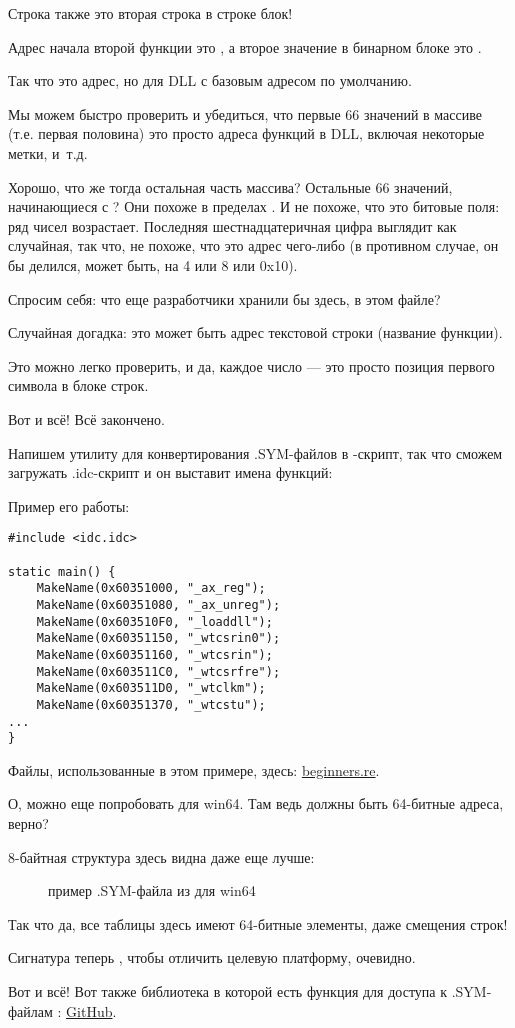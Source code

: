 Строка  также это вторая строка в строке блок!

Адрес начала второй функции это , а второе значение в бинарном блоке это .

Так что это адрес, но для DLL с базовым адресом по умолчанию.

Мы можем быстро проверить и убедиться, что первые 66 значений в массиве (т.е. первая половина)
это просто адреса функций в DLL, включая некоторые метки, и~т.д.

Хорошо, что же тогда остальная часть массива? 
Остальные 66 значений, начинающиеся с ? 
Они похоже в пределах \TT{[0...0x3F8]}. 
И не похоже, что это битовые поля: ряд чисел возрастает.
Последняя шестнадцатеричная цифра выглядит как случайная, так что, не похоже, что это
адрес чего-либо (в противном случае, он бы делился, может быть, на 4 или 8 или 0x10).

Спросим себя: что еще разработчики \oracle хранили бы здесь, в этом файле?

Случайная догадка: это может быть адрес текстовой строки (название функции).

Это можно легко проверить, и да, каждое число --- это просто позиция первого символа в блоке строк.

Вот и всё! Всё закончено.

Напишем утилиту для конвертирования .SYM-файлов в \IDA-скрипт, 
так что сможем загружать .idc-скрипт и он выставит имена функций:



Пример его работы:

\begin{lstlisting}[style=customc]
#include <idc.idc>

static main() {
	MakeName(0x60351000, "_ax_reg");
	MakeName(0x60351080, "_ax_unreg");
	MakeName(0x603510F0, "_loaddll");
	MakeName(0x60351150, "_wtcsrin0");
	MakeName(0x60351160, "_wtcsrin");
	MakeName(0x603511C0, "_wtcsrfre");
	MakeName(0x603511D0, "_wtclkm");
	MakeName(0x60351370, "_wtcstu");
...
}
\end{lstlisting}

Файлы, использованные в этом примере, здесь: \href{http://beginners.re/examples/oracle/SYM/}{beginners.re}.

\clearpage
О, можно еще попробовать \oracle для win64.
Там ведь должны быть 64-битные адреса, верно?

8-байтная структура здесь видна даже еще лучше:

\begin{figure}[H]
\centering
{}
\caption{пример .SYM-файла из \oracle для win64}
\label{fig:oracle_SYM_whole64}
\end{figure}

Так что да, все таблицы здесь имеют 64-битные элементы, даже смещения строк!

Сигнатура теперь , чтобы отличить целевую платформу, очевидно.

Вот и всё!
Вот также библиотека в которой есть функция для доступа к .SYM-файлам \oracle{}:
\href{https://github.com/DennisYurichev/porg/blob/master/lib/oracle_sym.c}{GitHub}.
